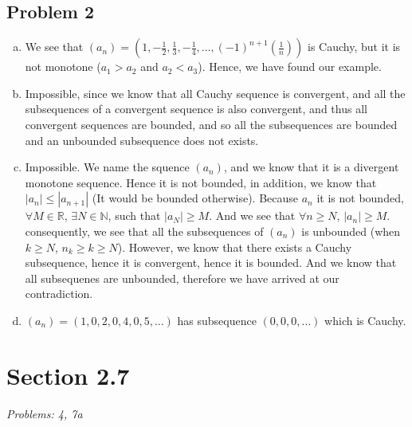 \documentclass[12pt]{article}
\begin{document}
\subsection*{Problem 2}
\begin{enumerate}[a).]
    \item {
        We see that $(a_n) = (1, -\frac{1}{2}, \frac{1}{3}, -\frac{1}{4}, \dots, (-1)^{n+1}(\frac{1}{n}))$ is Cauchy, but it is not monotone ($a_1 > a_2$ and $a_2 < a_3$). 
        Hence, we have found our example.
    }
    \item {
        Impossible, since we know that all Cauchy sequence is convergent, and all the subsequences of a convergent sequence is also convergent, and thus all convergent sequences are bounded, and so all the subsequences are bounded and an unbounded subsequence does not exists. 
    }
    \item {
        Impossible.
        We name the squence $(a_n)$, and we know that it is a divergent monotone sequence. 
        Hence it is not bounded, in addition, we know that $|a_n| \le |a_{n+1}|$ (It would be bounded otherwise). 
        Because $a_n$ it is not bounded, $\forall M \in \mathbb{R}$, $\exists N \in \mathbb{N}$, such that $|a_N| \ge M$. 
        And we see that $\forall n \ge N$, $|a_{n}| \ge M$. 
        consequently, we see that all the subsequences of $(a_n)$ is unbounded (when $k \ge N$, $n_k \ge k \ge N$). 
        However, we know that there exists a Cauchy subsequence, hence it is convergent, hence it is bounded. 
        And we know that all subsequenes are unbounded, therefore we have arrived at our contradiction.
    }
    \item {
        $(a_n) = (1, 0, 2, 0, 4, 0, 5, \dots )$ has subsequence $(0,0,0, \dots)$ which is Cauchy. 
    }
\end{enumerate}


\vspace*{1cm}


\section*{Section 2.7}
\textit{Problems: 4, 7a}
\end{document}
